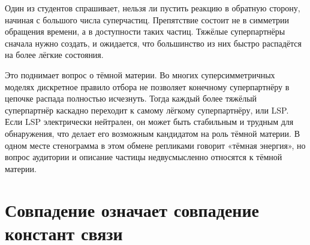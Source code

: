 Один из студентов спрашивает, нельзя ли пустить реакцию в обратную сторону, начиная с большого числа суперчастиц. Препятствие состоит не в симметрии обращения времени, а в доступности таких частиц. Тяжёлые суперпартнёры сначала нужно создать, и ожидается, что большинство из них быстро распадётся на более лёгкие состояния.

\begin{classroomqa}
\end{classroomqa}

Это поднимает вопрос о тёмной материи. Во многих суперсимметричных моделях дискретное правило отбора не позволяет конечному суперпартнёру в цепочке распада полностью исчезнуть. Тогда каждый более тяжёлый суперпартнёр каскадно переходит к самому лёгкому суперпартнёру, или LSP. Если LSP электрически нейтрален, он может быть стабильным и трудным для обнаружения, что делает его возможным кандидатом на роль тёмной материи. В одном месте стенограмма в этом обмене репликами говорит «тёмная энергия», но вопрос аудитории и описание частицы недвусмысленно относятся к тёмной материи.

\begin{classroomqa}
\end{classroomqa}

\section{Совпадение означает совпадение констант связи}

